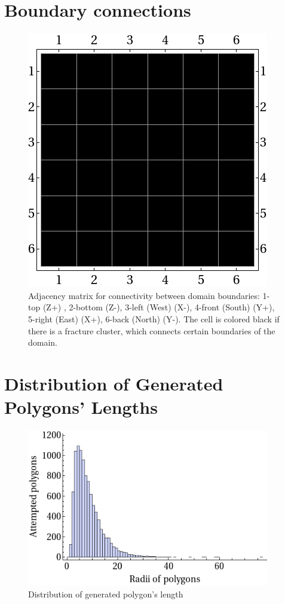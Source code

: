 \documentclass[a4paper,11pt]{article}
\begin{document}
\section{Boundary connections}
\begin{figure}[H]
   \centering
    \includegraphics[width=300pt]{graphClusterInfo.png}
 \caption[Connectivity matrix]{Adjacency matrix for connectivity between domain boundaries: 1-top (Z+) , 2-bottom (Z-), 3-left (West) (X-), 4-front (South) (Y+), 5-right (East) (X+), 6-back (North) (Y-). The cell is colored black if there is a fracture cluster, which connects certain boundaries of the domain.}
\end{figure}

\section{Distribution of Generated Polygons' Lengths}
\begin{figure}[H]
  \centering
	\includegraphics[width=300pt]{graphAttemptedDistribution.png}
  \caption{Distribution of generated polygon's length}
\end{figure}
\end{document}

